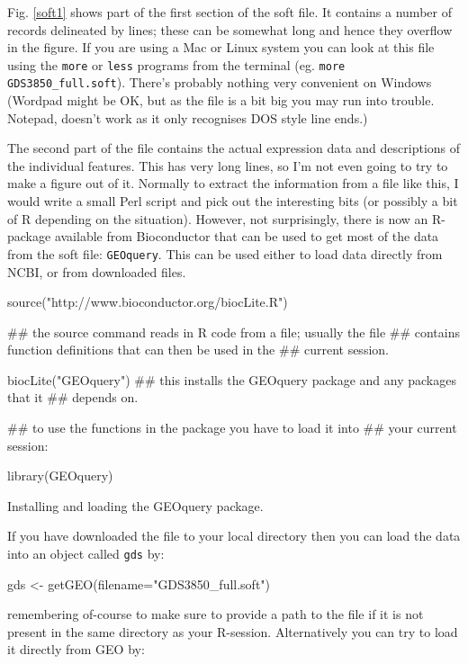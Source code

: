 \documentclass[11pt]{article}
\begin{document}
Fig. \ref{soft1} shows part of the first section of the soft file. It contains a number of records
delineated by lines; these can be somewhat long and hence they overflow in the figure. If you
are using a Mac or Linux system you can look at this file using the \texttt{more} or \texttt{less}
programs from the terminal (eg. \texttt{more GDS3850\_full.soft}). There's probably
nothing very convenient on Windows (Wordpad might be OK, but as the file is a bit big you
may run into trouble. Notepad, doesn't work as it only recognises DOS style line ends.) 

The second part of the file contains the actual expression data and descriptions of the individual
features. This has very long lines, so I'm not even going to try to make a figure
out of it. Normally to extract the information from a file like this, I would write
a small Perl script and pick out the interesting bits (or possibly a bit of R depending
on the situation). However, not surprisingly, there is now an R-package available from
Bioconductor that can be used to get most of the data from the soft file: \texttt{GEOquery}.
This can be used either to load data directly from NCBI, or from downloaded files.

\begin{listing}
\begin{rcode}
source("http://www.bioconductor.org/biocLite.R")

## the source command reads in R code from a file; usually the file
## contains function definitions that can then be used in the
## current session.

biocLite("GEOquery")
## this installs the GEOquery package and any packages that it
## depends on.

## to use the functions in the package you have to load it into
## your current session:

library(GEOquery)
\end{rcode}
\caption{Installing and loading the GEOquery package.}
\label{lis1}
\end{listing}

If you have downloaded the file to your local directory then you can
load the data into an object called \texttt{gds} by:

\begin{rcode}
  gds <- getGEO(filename="GDS3850_full.soft")
\end{rcode}

remembering of-course to make sure to provide a path to the file if
it is not present in the same directory as your R-session.
Alternatively you can try to load it directly from GEO by:
\end{document}
